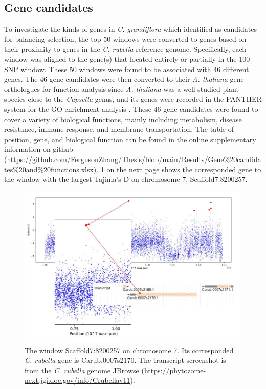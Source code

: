 \subsection{Gene candidates}
To investigate the kinds of genes in \emph{C. grandiflora} which identified as candidates for balancing selection, the top 50 windows were converted to genes based on their proximity to genes in the \emph{C. rubella} reference genome. Specifically, each window was aligned to the gene(s) that located entirely or partially in the 100 SNP window. These 50 windows were found to be associated with 46 different genes. The 46 gene candidates were then converted to their \emph{A. thaliana} gene orthologues for function analysis since \emph{A. thaliana} was a well-studied plant species close to the \emph{Capsella} genus, and its genes were recorded in the PANTHER system for the GO enrichment analysis \citep{RN17}. These 46 gene candidates were found to cover a variety of biological functions, mainly including metabolism, disease resistance, immune response, and membrane transportation. The table of position, gene, and biological function can be found in the online supplementary information on github (\url{https://github.com/FergusonZhang/Thesis/blob/main/Results/Gene\%20candidates\%20and\%20functions.xlsx}). \cref{fig:2} on the next page shows the corresponded gene to the window with the largest Tajima’s D on chromosome 7, Scaffold7:8200257.

\begin{figure}[h!]
    \centering
    \includegraphics[scale=0.7]{figs/3.JPG}
    \caption{The window Scaffold7:8200257 on chromosome 7. Its corresponded \emph{C. rubella} gene is Carub.0007s2170. The transcript screenshot is from the \emph{C. rubella} genome JBrowse (\url{https://phytozome-next.jgi.doe.gov/info/Crubellav11}).}
    \label{fig:2}
\end{figure}


